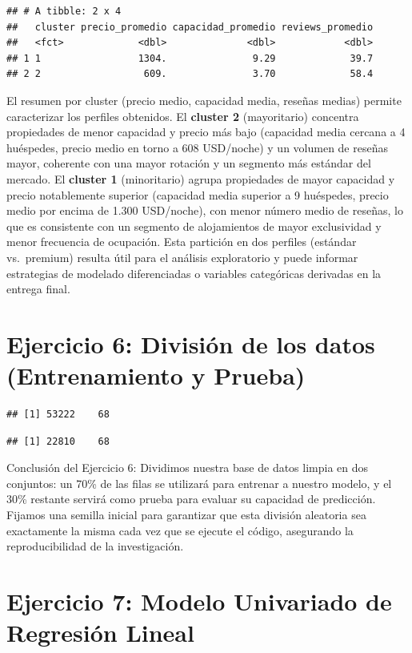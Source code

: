 \documentclass[
]{article}
\begin{document}
\begin{verbatim}
## # A tibble: 2 x 4
##   cluster precio_promedio capacidad_promedio reviews_promedio
##   <fct>             <dbl>              <dbl>            <dbl>
## 1 1                 1304.               9.29             39.7
## 2 2                  609.               3.70             58.4
\end{verbatim}

El resumen por cluster (precio medio, capacidad media, reseñas medias)
permite caracterizar los perfiles obtenidos. El \textbf{cluster 2}
(mayoritario) concentra propiedades de menor capacidad y precio más bajo
(capacidad media cercana a 4 huéspedes, precio medio en torno a 608
USD/noche) y un volumen de reseñas mayor, coherente con una mayor
rotación y un segmento más estándar del mercado. El \textbf{cluster 1}
(minoritario) agrupa propiedades de mayor capacidad y precio
notablemente superior (capacidad media superior a 9 huéspedes, precio
medio por encima de 1.300 USD/noche), con menor número medio de reseñas,
lo que es consistente con un segmento de alojamientos de mayor
exclusividad y menor frecuencia de ocupación. Esta partición en dos
perfiles (estándar vs.~premium) resulta útil para el análisis
exploratorio y puede informar estrategias de modelado diferenciadas o
variables categóricas derivadas en la entrega final.

\section{Ejercicio 6: División de los datos (Entrenamiento y
Prueba)}\label{ejercicio-6-divisiuxf3n-de-los-datos-entrenamiento-y-prueba}

\begin{verbatim}
## [1] 53222    68
\end{verbatim}

\begin{verbatim}
## [1] 22810    68
\end{verbatim}

Conclusión del Ejercicio 6: Dividimos nuestra base de datos limpia en
dos conjuntos: un 70\% de las filas se utilizará para entrenar a nuestro
modelo, y el 30\% restante servirá como prueba para evaluar su capacidad
de predicción. Fijamos una semilla inicial para garantizar que esta
división aleatoria sea exactamente la misma cada vez que se ejecute el
código, asegurando la reproducibilidad de la investigación.

\section{Ejercicio 7: Modelo Univariado de Regresión
Lineal}\label{ejercicio-7-modelo-univariado-de-regresiuxf3n-lineal}
\end{document}
